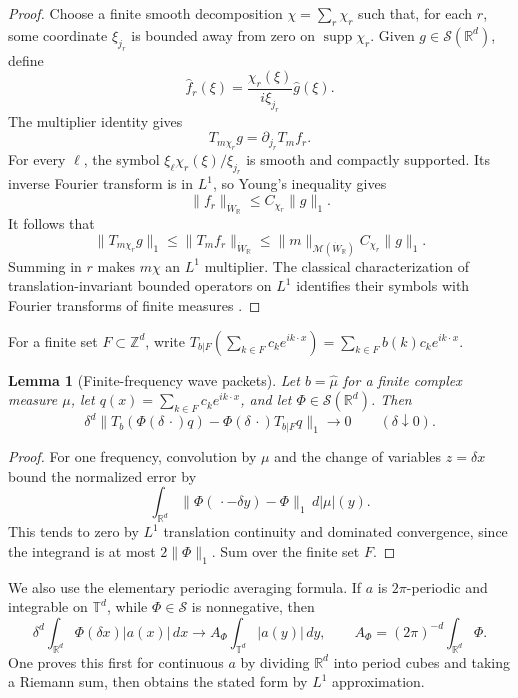 \documentclass[11pt]{article}
\newtheorem{lemma}[theorem]{Lemma}
\newcommand{\R}{\mathbb R}
\newcommand{\T}{\mathbb T}
\newcommand{\Z}{\mathbb Z}
\newcommand{\M}{\mathcal M}
\newcommand{\wh}{\widehat}
\begin{document}
\begin{proof}
Choose a finite smooth decomposition $\chi=\sum_r\chi_r$ such that, for
each $r$, some coordinate $\xi_{j_r}$ is bounded away from zero on
$\operatorname{supp}\chi_r$.  Given $g\in\mathcal S(\R^d)$, define
\[
 \wh f_r(\xi)=\frac{\chi_r(\xi)}{i\xi_{j_r}}\wh g(\xi).
\]
The multiplier identity gives
\[
 T_{m\chi_r}g=\partial_{j_r}T_mf_r.
\]
For every $\ell$, the symbol
$\xi_\ell\chi_r(\xi)/\xi_{j_r}$ is smooth and compactly supported.  Its
inverse Fourier transform is in $L^1$, so Young's inequality gives
\[
 \|f_r\|_{\dot W_{\R}}\le C_{\chi_r}\|g\|_1.
\]
It follows that
\[
 \|T_{m\chi_r}g\|_1
 \le \|T_mf_r\|_{\dot W_{\R}}
 \le \|m\|_{\M(\dot W_{\R})}C_{\chi_r}\|g\|_1.
\]
Summing in $r$ makes $m\chi$ an $L^1$ multiplier.  The classical
characterization of translation-invariant bounded operators on $L^1$
identifies their symbols with Fourier transforms of finite measures
\cite{Rudin}.
\end{proof}

For a finite set $F\subset\Z^d$, write
$T_{b|F}(\sum_{k\in F}c_ke^{ik\cdot x})
=\sum_{k\in F}b(k)c_ke^{ik\cdot x}$.

\begin{lemma}[Finite-frequency wave packets]\label{lem:packet}
Let $b=\wh\mu$ for a finite complex measure $\mu$, let
$q(x)=\sum_{k\in F}c_ke^{ik\cdot x}$, and let $\Phi\in\mathcal S(\R^d)$.
Then
\begin{equation}\label{eq:packet}
 \delta^d\big\|T_b(\Phi(\delta\,\cdot)q)
 -\Phi(\delta\,\cdot)T_{b|F}q\big\|_1\longrightarrow0
 \qquad(\delta\downarrow0).
\end{equation}
\end{lemma}

\begin{proof}
For one frequency, convolution by $\mu$ and the change of variables
$z=\delta x$ bound the normalized error by
\[
 \int_{\R^d}\|\Phi(\,\cdot-\delta y)-\Phi\|_1\,d|\mu|(y).
\]
This tends to zero by $L^1$ translation continuity and dominated
convergence, since the integrand is at most $2\|\Phi\|_1$.  Sum over the
finite set $F$.
\end{proof}

We also use the elementary periodic averaging formula.  If $a$ is
$2\pi$-periodic and integrable on $\T^d$, while $\Phi\in\mathcal S$ is
nonnegative, then
\begin{equation}\label{eq:averaging}
 \delta^d\int_{\R^d}\Phi(\delta x)|a(x)|\,dx
 \longrightarrow A_\Phi\int_{\T^d}|a(y)|\,dy,
 \qquad
 A_\Phi=(2\pi)^{-d}\int_{\R^d}\Phi.
\end{equation}
One proves this first for continuous $a$ by dividing $\R^d$ into period
cubes and taking a Riemann sum, then obtains the stated form by $L^1$
approximation.
\end{document}

